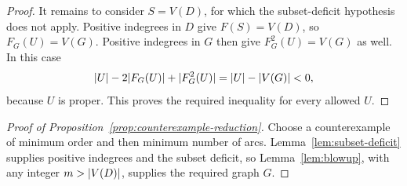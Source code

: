 \begin{proof}
It remains to consider $S=V(D)$, for which the subset-deficit hypothesis
does not apply.  Positive indegrees in $D$ give $F(S)=V(D)$, so
$F_G(U)=V(G)$.  Positive indegrees in $G$ then give
$F_G^2(U)=V(G)$ as well.  In this case
\[
  \lvert U\rvert-2\lvert F_G(U)\rvert+\lvert F_G^2(U)\rvert
  =\lvert U\rvert-\lvert V(G)\rvert<0,
\]
because $U$ is proper.  This proves the required inequality for every
allowed $U$.
\end{proof}

\begin{proof}[Proof of Proposition~\ref{prop:counterexample-reduction}]
Choose a counterexample of minimum order and then minimum number of
arcs.  Lemma~\ref{lem:subset-deficit} supplies positive indegrees and
the subset deficit, so Lemma~\ref{lem:blowup}, with any integer
$m>\lvert V(D)\rvert$, supplies the required graph $G$.
\end{proof}
